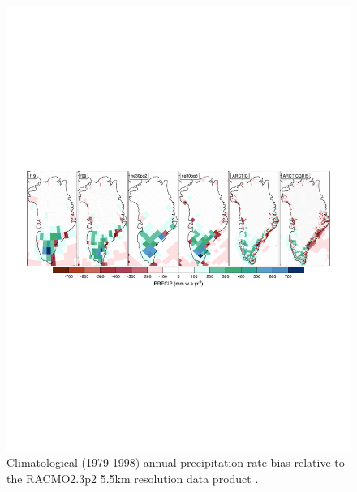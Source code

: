 \documentclass[draft]{agujournal2019}
\begin{document}
\begin{figure}[t]
\begin{center}
         \includegraphics[width=130mm]{figs/temp_diffRACMO23p2_5p5km.pdf}
\end{center}
\caption{Climatological (1979-1998) annual precipitation rate bias relative to the RACMO2.3p2 5.5km resolution data product \cite{NETAL2019SCIENCE}.}
\label{fig:prect}
\end{figure}
\end{document}
